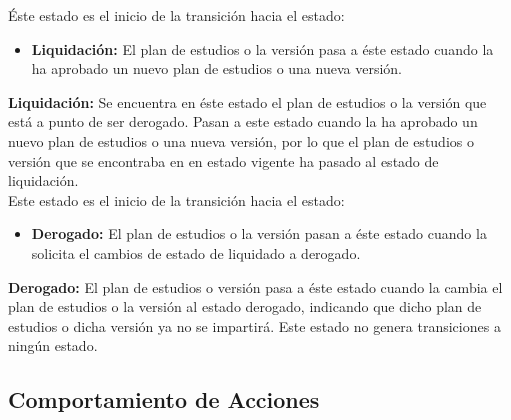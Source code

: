 Éste estado es el inicio de la transición hacia el estado:
\begin{itemize}
	\item \textbf{Liquidación:} El plan de estudios o la versión pasa a éste estado cuando la  ha aprobado un nuevo plan de estudios o una nueva versión. 
\end{itemize}

\noindent \textbf{Liquidación:} Se encuentra en éste estado el plan de estudios o la versión que está a punto de ser derogado. Pasan a este estado cuando la   ha aprobado un nuevo plan de estudios o una nueva versión, por lo que el plan de estudios o versión que se encontraba en en estado vigente ha pasado al estado de liquidación.\\

Este estado es el inicio de la transición hacia el estado:
\begin{itemize}
	\item \textbf{Derogado:} El plan de estudios o la versión pasan a éste estado cuando la  solicita el cambios de estado de liquidado a derogado. 
\end{itemize} 

\noindent \textbf{Derogado:} El plan de estudios o versión pasa a éste estado cuando la  cambia el plan de estudios o la versión al estado derogado, indicando que dicho plan de estudios o dicha versión ya no se impartirá. Este estado no genera transiciones a ningún estado.

\newpage
\subsection{Comportamiento de Acciones}
\href{ComportamientoDeAcciones}{}
